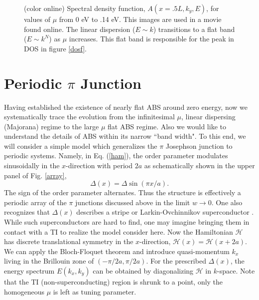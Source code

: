 \begin{figure}[h]
\caption{(color online) 
Spectral density function, $A(x=.5L,k_y,E)$, for values of $\mu$ from 0 eV to .14 eV. This images are used in a movie found online\cite{lababidimovie}. The linear dispersion ($E\sim k$) transitions to a flat band ($E\sim k^N$) as $\mu$ increases. This flat band is responsible for the peak in DOS in figure \ref{dosf}.
}\label{movie}
\end{figure}


\section{Periodic $\pi$ Junction}
Having established the existence of nearly flat ABS around zero energy, now
we systematically trace the evolution from the infinitesimal $\mu$, linear dispersing (Majorana) regime
to the large $\mu$ flat ABS regime. Also we would like to understand the details of ABS 
within its narrow ``band width". To this end, we will consider a simple model which generalizes the $\pi$ Josephson
junction to periodic systems. Namely, in Eq. (\ref{ham}), the order parameter modulates sinusoidally 
in the $x$-direction with period $2a$ as schematically shown in the upper panel of Fig. \ref{array}, 
\begin{equation}
\Delta(x)=\Delta  \sin(\pi x/a).
\end{equation}
The sign of the order parameter alternates. Thus the structure is effectively a periodic array of
the $\pi$ junctions discussed above in the limit $w \rightarrow 0$. One also recognizes that
$\Delta(x)$ describes a stripe or Larkin-Ovchinnikov superconductor \cite{LO}.
While such superconductors are hard to find, one may imagine bringing them in contact with a TI to realize
the model consider here. Now the Hamiltonian $\mathcal{H}$ has discrete
translational symmetry in the $x$-direction, $\mathcal{H}(x)=\mathcal{H}(x+2a)$. We can apply the 
Bloch-Floquet theorem and introduce quasi-momentum $k_x$ living in the Brillouin zone of $(-\pi/2a,\pi/2a)$. 
For the prescribed $\Delta(x)$, the energy spectrum $E(k_x,k_y)$
can be obtained by diagonalizing $\mathcal{H}$ in $k$-space. Note that the TI (non-superconducting) region is shrunk
to a point, only the homogeneous $\mu$ is left as tuning parameter.


